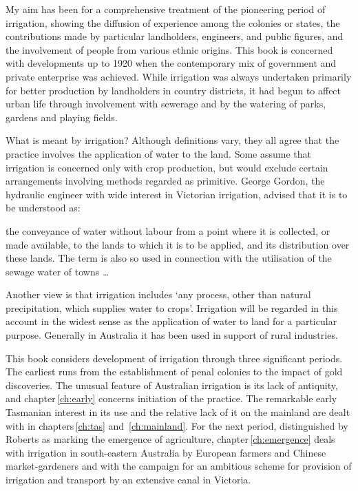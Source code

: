 My aim has been for a comprehensive treatment of the pioneering period
of irrigation, showing the diffusion of experience among the colonies
or states, the contributions made by particular landholders,
engineers, and public figures, and the involvement of people from
various ethnic origins.  This book is concerned with developments up
to 1920 when the contemporary mix of government and private enterprise
was achieved.  While irrigation was always undertaken primarily for
better production by landholders in country districts, it had begun to
affect urban life through involvement with sewerage and by the
watering of parks, gardens and playing fields.

What is meant by irrigation?  Although definitions vary, they all
agree that the practice involves the application of water to the land.
Some assume that irrigation is concerned only with crop production,
but would exclude certain arrangements involving methods regarded as
primitive.  George Gordon, the hydraulic engineer with wide interest
in Victorian irrigation, advised that it is to be understood as:
\begin{Quote}
	the conveyance of water without labour from a point where it
	is collected, or made available, to the lands to which it is
	to be applied, and its distribution over these lands. The term
	is also so used in connection with the utilisation of the
	sewage water of towns \ldots{}
\end{Quote}
Another view is that irrigation includes `any process, other than
natural precipitation, which supplies water to crops'.  Irrigation
will be regarded in this account in the widest sense as the
application of water to land for a particular purpose.  Generally in
Australia it has been used in support of rural
industries.

This book considers development of irrigation through three
significant periods.  The earliest runs from the establishment of
penal colonies to the impact of gold discoveries.  The unusual feature
of Australian irrigation is its lack of antiquity, and
chapter\,\ref{ch:early} concerns initiation of the practice.  The
remarkable early Tasmanian interest in its use and the relative lack
of it on the mainland are dealt with in chapters\,\ref{ch:tas}
and~\ref{ch:mainland}.  For the next period, distinguished by
Roberts  as marking the emergence of
agriculture, chapter\,\ref{ch:emergence} deals with irrigation in
south-eastern Australia by European farmers and Chinese
market-gardeners and with the campaign for an ambitious scheme for
provision of irrigation and transport by an extensive canal in
Victoria.

